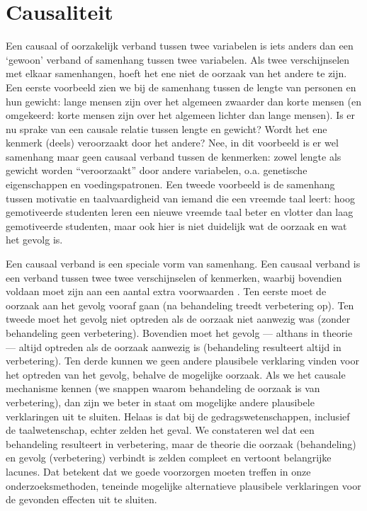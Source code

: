 \documentclass[
]{book}
\begin{document}
\section{Causaliteit}\label{sec:causaliteit}

Een causaal of oorzakelijk verband tussen twee variabelen is iets anders
dan een `gewoon' verband of samenhang tussen twee variabelen. Als twee
verschijnselen met elkaar samenhangen, hoeft het ene niet de oorzaak van
het andere te zijn. Een eerste voorbeeld zien we bij de samenhang tussen
de lengte van personen en hun gewicht: lange mensen zijn over het
algemeen zwaarder dan korte mensen (en omgekeerd: korte mensen zijn over
het algemeen lichter dan lange mensen). Is er nu sprake van een causale
relatie tussen lengte en gewicht? Wordt het ene kenmerk (deels)
veroorzaakt door het andere? Nee, in dit voorbeeld is er wel samenhang
maar geen causaal verband tussen de kenmerken: zowel lengte als gewicht
worden ``veroorzaakt'' door andere variabelen, o.a. genetische
eigenschappen en voedingspatronen. Een tweede voorbeeld is de samenhang
tussen motivatie en taalvaardigheid van iemand die een vreemde taal
leert: hoog gemotiveerde studenten leren een nieuwe vreemde taal beter
en vlotter dan laag gemotiveerde studenten, maar ook hier is niet
duidelijk wat de oorzaak en wat het gevolg is.

Een causaal verband is een speciale vorm van samenhang. Een causaal
verband is een verband tussen twee twee verschijnselen of kenmerken,
waarbij bovendien voldaan moet zijn aan een aantal extra voorwaarden
\citep{SCC02}. Ten eerste moet de oorzaak aan het gevolg vooraf gaan (na
behandeling treedt verbetering op). Ten tweede moet het gevolg niet
optreden als de oorzaak niet aanwezig was (zonder behandeling geen
verbetering). Bovendien moet het gevolg --- althans in theorie ---
altijd optreden als de oorzaak aanwezig is (behandeling resulteert
altijd in verbetering). Ten derde kunnen we geen andere plausibele
verklaring vinden voor het optreden van het gevolg, behalve de mogelijke
oorzaak. Als we het causale mechanisme kennen (we snappen waarom
behandeling de oorzaak is van verbetering), dan zijn we beter in staat
om mogelijke andere plausibele verklaringen uit te sluiten. Helaas is
dat bij de gedragswetenschappen, inclusief de taalwetenschap, echter
zelden het geval. We constateren wel dat een behandeling resulteert in
verbetering, maar de theorie die oorzaak (behandeling) en gevolg
(verbetering) verbindt is zelden compleet en vertoont belangrijke
lacunes. Dat betekent dat we goede voorzorgen moeten treffen in onze
onderzoeksmethoden, teneinde mogelijke alternatieve plausibele
verklaringen voor de gevonden effecten uit te sluiten.
\end{document}
